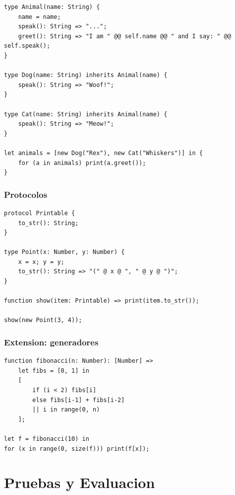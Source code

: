\documentclass[12pt,a4paper]{article}
\begin{document}
\begin{lstlisting}[caption={Herencia y dispatch virtual}]
type Animal(name: String) {
    name = name;
    speak(): String => "...";
    greet(): String => "I am " @@ self.name @@ " and I say: " @@ self.speak();
}

type Dog(name: String) inherits Animal(name) {
    speak(): String => "Woof!";
}

type Cat(name: String) inherits Animal(name) {
    speak(): String => "Meow!";
}

let animals = [new Dog("Rex"), new Cat("Whiskers")] in {
    for (a in animals) print(a.greet());
}
\end{lstlisting}

\subsubsection{Protocolos}

\begin{lstlisting}[caption={Protocolo Printable}]
protocol Printable {
    to_str(): String;
}

type Point(x: Number, y: Number) {
    x = x; y = y;
    to_str(): String => "(" @ x @ ", " @ y @ ")";
}

function show(item: Printable) => print(item.to_str());

show(new Point(3, 4));
\end{lstlisting}

\subsubsection{Extension: generadores}

\begin{lstlisting}[caption={Fibonacci con vectores}]
function fibonacci(n: Number): [Number] =>
    let fibs = [0, 1] in
    [
        if (i < 2) fibs[i]
        else fibs[i-1] + fibs[i-2]
        || i in range(0, n)
    ];

let f = fibonacci(10) in
for (x in range(0, size(f))) print(f[x]);
\end{lstlisting}

\section{Pruebas y Evaluacion}
\end{document}
